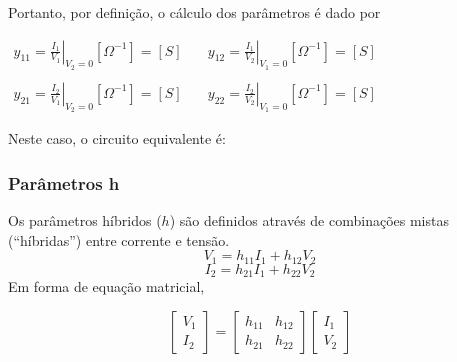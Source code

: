 \documentclass{article}
\numberwithin{equation}{section}
\let\dfr\dfrac
\begin{document}
\noindent Portanto, por definição, o cálculo dos parâmetros é dado por
\begin{center}
    $\begin{matrix} %
            y_{11}=\displaystyle\left.\frac{I_{1}}{V_{1}}\right|_{V_{2}=0} [\Omega^{-1}]=[S] &\quad y_{12}=\displaystyle\left.\frac{I_{1}}{V_{2}}\right|_{V_{1}=0} [\Omega^{-1}]=[S]\\ \\
            y_{21}=\displaystyle\left.\frac{I_{2}}{V_{1}}\right|_{V_{2}=0} [\Omega^{-1}]=[S] &\quad y_{22}=\displaystyle\left.\frac{I_{2}}{V_{2}}\right|_{V_{1}=0} [\Omega^{-1}]=[S]
    \end{matrix}$
\end{center}

Neste caso, o circuito equivalente é:

\begin{center}
\end{center}

\subsubsection{Parâmetros h}
\label{subsubsec:quadripolosh}
Os parâmetros híbridos ($h$) são definidos através de combinações mistas (``híbridas'') entre corrente e tensão.
\begin{equation*}
    V_{1}=h_{11}I_{1}+h_{12}V_{2}
\end{equation*}
\begin{equation*}
    I_{2}=h_{21}I_{1}+h_{22}V_{2}
\end{equation*}
Em forma de equação matricial,

\begin{equation}
    \begin{bmatrix}
        V_{1} \\
        I_{2}
    \end{bmatrix}
    = %
    \begin{bmatrix}
        h_{11} & h_{12} \\
        h_{21} & h_{22}
    \end{bmatrix}
    \begin{bmatrix}
        I_{1} \\
        V_{2}
    \end{bmatrix}
\end{equation}
\end{document}
